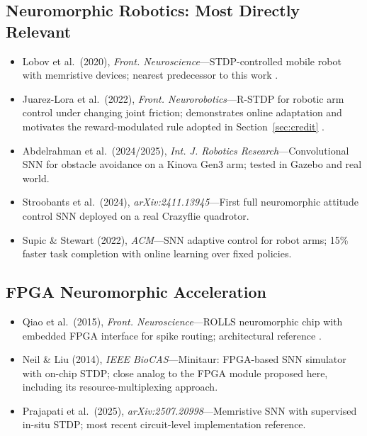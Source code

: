 \documentclass[11pt,a4paper]{article}
\begin{document}
\subsection*{Neuromorphic Robotics: Most Directly Relevant}
\begin{itemize}[leftmargin=*, itemsep=2pt]
  \item Lobov et al.\ (2020), \textit{Front. Neuroscience}---STDP-controlled mobile
        robot with memristive devices; nearest predecessor to this work \cite{lobov2020}.
  \item Juarez-Lora et al.\ (2022), \textit{Front. Neurorobotics}---R-STDP for robotic
        arm control under changing joint friction; demonstrates online adaptation and
        motivates the reward-modulated rule adopted in Section~\ref{sec:credit}
        \cite{juarez2022}.
  \item Abdelrahman et al.\ (2024/2025), \textit{Int. J. Robotics Research}---Convolutional
        SNN for obstacle avoidance on a Kinova Gen3 arm; tested in Gazebo and real world.
  \item Stroobants et al.\ (2024), \textit{arXiv:2411.13945}---First full neuromorphic
        attitude control SNN deployed on a real Crazyflie quadrotor.
  \item Supic \& Stewart (2022), \textit{ACM}---SNN adaptive control for robot arms;
        15\% faster task completion with online learning over fixed policies.
\end{itemize}

\subsection*{FPGA Neuromorphic Acceleration}
\begin{itemize}[leftmargin=*, itemsep=2pt]
  \item Qiao et al.\ (2015), \textit{Front. Neuroscience}---ROLLS neuromorphic chip
        with embedded FPGA interface for spike routing; architectural reference
        \cite{qiao2015}.
  \item Neil \& Liu (2014), \textit{IEEE BioCAS}---Minitaur: FPGA-based SNN simulator
        with on-chip STDP; close analog to the FPGA module proposed here, including
        its resource-multiplexing approach.
  \item Prajapati et al.\ (2025), \textit{arXiv:2507.20998}---Memristive SNN with
        supervised in-situ STDP; most recent circuit-level implementation reference.
\end{itemize}
\end{document}
